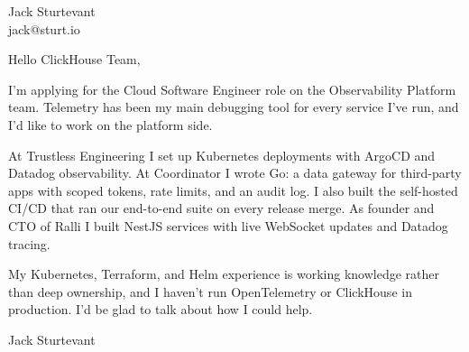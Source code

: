 \documentclass[11pt]{article}
\begin{document}
\raggedright

{\namefont\fontsize{20pt}{24pt}\selectfont Jack Sturtevant}\\[-0.3em]
jack@sturt.io

\vspace{1.2em}

Hello ClickHouse Team,

I'm applying for the Cloud Software Engineer role on the Observability Platform team. Telemetry has been my main debugging tool for every service I've run, and I'd like to work on the platform side.

At Trustless Engineering I set up Kubernetes deployments with ArgoCD and Datadog observability. At Coordinator I wrote Go: a data gateway for third-party apps with scoped tokens, rate limits, and an audit log. I also built the self-hosted CI/CD that ran our end-to-end suite on every release merge. As founder and CTO of Ralli I built NestJS services with live WebSocket updates and Datadog tracing.

My Kubernetes, Terraform, and Helm experience is working knowledge rather than deep ownership, and I haven't run OpenTelemetry or ClickHouse in production. I'd be glad to talk about how I could help.

\vspace{0.6em}
Jack Sturtevant
\end{document}
